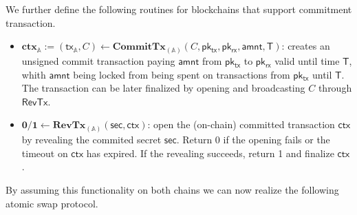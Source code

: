 \documentclass{article}      	%
\begin{document}
We further define the following routines for blockchains that support commitment transaction.
\begin{itemize}[topsep=0pt, itemsep=0pt, leftmargin=2em]
	\item $\mathbf{ctx}_{\mathbb{A}} := (\mathsf{tx_{\mathbb{A}}}, C) \gets \mathbf{CommitTx}_{(\mathbb{A})}(C, \mathsf{pk_{tx}}, \mathsf{pk_{rx}}, \mathsf{amnt}, \mathsf{T})$: creates an unsigned commit transaction paying $\mathsf{amnt}$ from $\mathsf{pk_{tx}}$ to $\mathsf{pk_{rx}}$ valid until time $\mathsf{T}$, whith  $\mathsf{amnt}$ being locked from being spent on transactions from $\mathsf{pk_{tx}}$ until $\mathsf{T}$. The transaction can be later finalized by opening and broadcasting $C$ through $\mathsf{RevTx}$.
\item $ \mathbf{0/1} \gets \mathbf{RevTx}_{(\mathbb{A})}(\mathsf{sec}, \mathsf{ctx})$: open the (on-chain) committed transaction $\mathsf{ctx}$ by revealing the commited secret $\mathsf{sec}$. Return 0 if the opening fails or the timeout on $\mathsf{ctx}$ has expired. If the revealing succeeds, return 1 and finalize $\mathsf{ctx}$.
\end{itemize}

By assuming this functionality on both chains we can now realize the following atomic swap protocol.
\end{document}

